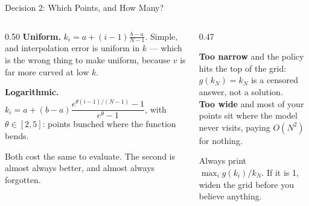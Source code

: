 \begin{frame}{Decision 2: Which Points, and How Many?}
\begin{columns}[T]
\begin{column}{0.50\textwidth}
\small
\textbf{Uniform.} $k_i=a+(i-1)\frac{b-a}{N-1}$. Simple, and interpolation error is uniform in $k$ --- which is the wrong thing to make uniform, because $v$ is far more curved at low $k$.
\medskip

\textbf{Logarithmic.} $k_i=a+(b-a)\dfrac{e^{\theta(i-1)/(N-1)}-1}{e^{\theta}-1}$, with $\theta\in[2,5]$: points bunched where the function bends.
\medskip

Both cost the same to evaluate. The second is almost always better, and almost always forgotten.
\end{column}
\begin{column}{0.47\textwidth}
\begin{cautionbox}[title=\textbf{Two boundary mistakes}]\footnotesize
\textbf{Too narrow} and the policy hits the top of the grid: $g(k_N)=k_N$ is a censored answer, not a solution.\\[1mm]
\textbf{Too wide} and most of your points sit where the model never visits, paying $O(N^2)$ for nothing.
\end{cautionbox}
\medskip
\begin{examplebox}\footnotesize
Always print $\max_i g(k_i)/k_N$. If it is 1, widen the grid before you believe anything.
\end{examplebox}
\end{column}
\end{columns}
\vspace{1mm}
\end{frame}

